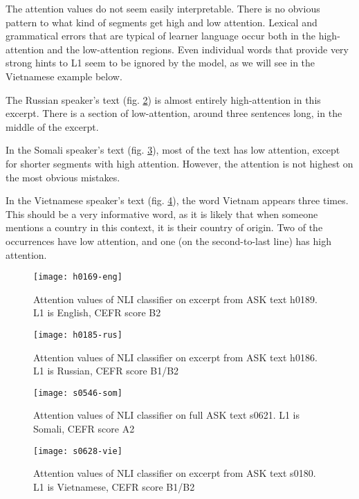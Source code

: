 The attention values do not seem easily interpretable. There is no obvious
pattern to what kind of segments get high and low attention. Lexical and
grammatical errors that are typical of learner language occur both in the
high-attention and the low-attention regions. Even individual words that
provide very strong hints to \ac{L1} seem to be ignored by the model, as we
will see in the Vietnamese example below.

The Russian speaker's text (fig. \ref{fig:rus-attention}) is almost entirely
high-attention in this excerpt. There is a section of low-attention, around
three sentences long, in the middle of the excerpt.

In the Somali speaker's text (fig. \ref{fig:som-attention}), most of the text
has low attention, except for shorter segments with high attention. However, the
attention is not highest on the most obvious mistakes.

In the Vietnamese speaker's text (fig. \ref{fig:vie-attention}), the word
Vietnam appears three times. This should be a very informative word, as it is
likely that when someone mentions a country in this context, it is their
country of origin. Two of the occurrences have low attention, and one (on the
second-to-last line) has high attention. 

\begin{figure}
  \centering
  \texttt{[image: h0169-eng]}
  \caption{Attention values of NLI classifier on excerpt from ASK text h0189.
           L1 is English, CEFR score B2}
  \label{fig:eng-attention}
\end{figure}

\begin{figure}
  \centering
  \texttt{[image: h0185-rus]}
  \caption{Attention values of NLI classifier on excerpt from ASK text h0186.
           L1 is Russian, CEFR score B1/B2}
  \label{fig:rus-attention}
\end{figure}

\begin{figure}
  \centering
  \texttt{[image: s0546-som]}
  \caption{Attention values of NLI classifier on full ASK text s0621.
           L1 is Somali, CEFR score A2}
  \label{fig:som-attention}
\end{figure}

\begin{figure}
  \centering
  \texttt{[image: s0628-vie]}
  \caption{Attention values of NLI classifier on excerpt from ASK text s0180.
           L1 is Vietnamese, CEFR score B1/B2}
  \label{fig:vie-attention}
\end{figure}


